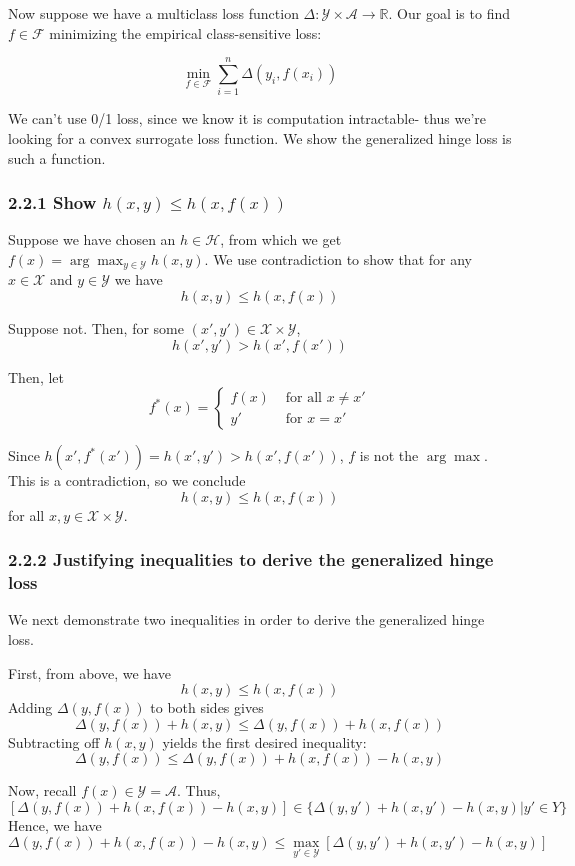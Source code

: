 \documentclass[paper=a4, fontsize=11pt]{scrartcl} %
\numberwithin{equation}{section} %
\numberwithin{figure}{section} %
\numberwithin{table}{section} %
\begin{document}
Now suppose we have a multiclass loss function $\Delta: \mathcal{Y} \times \mathcal{A} \to \mathbb{R}$. Our goal is to find $f \in \mathcal{F}$ minimizing the empirical class-sensitive loss:

\[\min_{f \in \mathcal{F}} \sum_{i = 1}^n \Delta(y_i, f(x_i))\]

We can't use 0/1 loss, since we know it is computation intractable- thus we're looking for a convex surrogate loss function. We show the generalized hinge loss is such a function.

\subsubsection*{2.2.1 Show $h(x, y) \leq h(x, f(x))$}

Suppose we have chosen an $h \in \mathcal{H}$, from which we get $f(x) = \arg \max_{y \in \mathcal{Y}} h(x, y)$. We use contradiction to show that for any $x \in \mathcal{X}$ and $y \in \mathcal{Y}$ we have
\[h(x,y) \leq h(x, f(x))\]

Suppose not. Then, for some $(x', y') \in \mathcal{X} \times \mathcal{Y}$,
\[h(x', y') > h(x', f(x'))\]

Then, let
\[f^*(x) =
\begin{cases}
f(x) & \textrm{ for all } x \ne x' \\
y' & \textrm{ for } x = x'
\end{cases}
\]

Since $h(x', f^*(x')) = h(x', y') > h (x', f(x'))$, $f$ is not the $\arg \max$. This is a contradiction, so we conclude
\[h(x,y) \leq h(x, f(x))\]
for all $x, y \in \mathcal{X} \times \mathcal{Y}$.

\subsubsection*{2.2.2 Justifying inequalities to derive the generalized hinge loss}

We next demonstrate two inequalities in order to derive the generalized hinge loss.

First, from above, we have
\[h(x,y) \leq h(x, f(x))\]
Adding $\Delta(y, f(x))$ to both sides gives
\[\Delta(y, f(x)) + h(x,y) \leq \Delta(y, f(x))+ h(x, f(x))\]
Subtracting off $h(x,y)$ yields the first desired inequality:
\[\Delta(y, f(x)) \leq \Delta(y, f(x))+ h(x, f(x)) - h(x,y)\]

Now, recall $f(x) \in \mathcal{Y} = \mathcal{A}$. Thus,
\[[\Delta(y, f(x))+ h(x, f(x)) - h(x,y)] \in \{\Delta(y, y')+ h(x, y') - h(x,y) | y' \in Y\}\]
Hence, we have
\[\Delta(y, f(x))+ h(x, f(x)) - h(x,y) \leq \max_{y' \in \mathcal{Y}} [\Delta(y, y')+ h(x, y') - h(x,y)]\]
\end{document}

